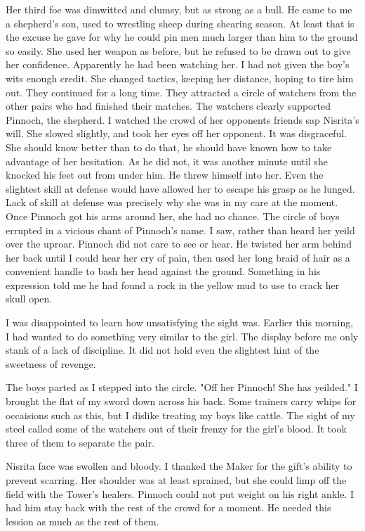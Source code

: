 \documentclass{article}
\begin{document}
Her third foe was dimwitted and clumsy, but as strong as a bull. He came to me a shepherd's son, used to wrestling sheep during shearing season. At least that is the excuse he gave for why he could pin men much larger than him to the ground so easily. She used her weapon as before, but he refused to be drawn out to give her confidence. Apparently he had been watching her. I had not given the boy's wits enough credit. She changed tactics, keeping her distance, hoping to tire him out. They continued for a long time. They attracted a circle of watchers from the other pairs who had finished their matches. The watchers clearly supported Pinnoch, the shepherd. I watched the crowd of her opponents friends sap Nisrita's will. She slowed slightly, and took her eyes off her opponent. It was disgraceful. She should know better than to do that, he should have known how to take advantage of her hesitation. As he did not, it was another minute until she knocked his feet out from under him. He threw himself into her. Even the slightest skill at defense would have allowed her to escape his grasp as he lunged. Lack of skill at defense was precisely why she was in my care at the moment. Once Pinnoch got his arms around her, she had no chance. The circle of boys errupted in a vicious chant of Pinnoch's name. I saw, rather than heard her yeild over the uproar. Pinnoch did not
care to see or hear. He twisted her arm behind her back until I could hear her cry of pain, then used her long braid of hair as a convenient handle to bash her head against the ground. Something in his expression told me he had found a rock in the yellow mud to use to crack her skull open. 

I was disappointed to learn how unsatisfying the sight was. Earlier this morning, I had wanted to do something very similar to the girl. The display before me only stank of a lack of discipline. It did not hold even the slightest hint of the sweetness of revenge. 

The boys parted as I stepped into the circle. "Off her Pinnoch! She has yeilded." I brought the flat of my sword down across his back. Some trainers carry whips for occaisions such as this, but I dislike treating my boys like cattle. The sight of my steel called some of the watchers out of their frenzy for the girl's blood. It took three of them to separate the pair. 

Nisrita face was swollen and bloody. I thanked the Maker for the gift's ability to prevent scarring. Her shoulder was at least sprained, but she could limp off the field with the Tower's healers. Pinnoch could not put weight on his right ankle. I had him stay back with the rest of the crowd for a moment. He needed this lession as much as the rest of them. 
\end{document}

